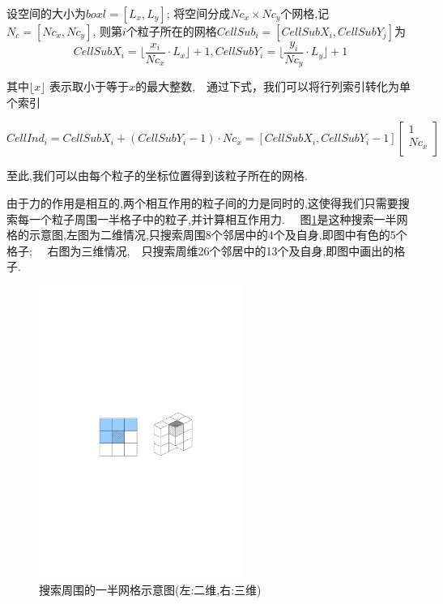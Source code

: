 \documentclass[a4paper]{article}
\begin{document}
设空间的大小为$boxl=[L_x,L_y]$; 将空间分成$Nc_x\times Nc_y$个网格,记$N_c=[Nc_x, Nc_y]$, 则第$i$个粒子所在的网格$CellSub_i =[CellSubX_i,CellSubY_j]$为
\[
CellSubX_i = \lfloor\frac{x_i}{Nc_x}\cdot L_x \rfloor + 1, CellSubY_i = \lfloor \frac{y_i}{Nc_y}\cdot L_y \rfloor + 1
\]

其中$\lfloor x\rfloor$ 表示取小于等于$x$的最大整数,　通过下式，我们可以将行列索引转化为单个索引

\[
CellInd_i = CellSubX_i + (CellSubY_i-1)\cdot Nc_x = [CellSubX_i, CellSubY_i -1]\left[
                                                                                \begin{array}{c}
                                                                                  1 \\
                                                                                  Nc_x \\
                                                                                \end{array}
                                                                              \right]
\]

至此,我们可以由每个粒子的坐标位置得到该粒子所在的网格.

由于力的作用是相互的,两个相互作用的粒子间的力是同时的,这使得我们只需要搜索每一个粒子周围一半格子中的粒子,并计算相互作用力.　
图\ref{neighbor}是这种搜索一半网格的示意图,左图为二维情况,只搜索周围8个邻居中的4个及自身,即图中有色的5个格子;　
右图为三维情况,　只搜索周维26个邻居中的13个及自身,即图中画出的格子.


\begin{figure}[!htb]
\centering
\includegraphics[width=0.6\textwidth]{fig03.pdf}
\caption{\label{neighbor}搜索周围的一半网格示意图(左:二维,右:三维)}
\end{figure}
\end{document}
